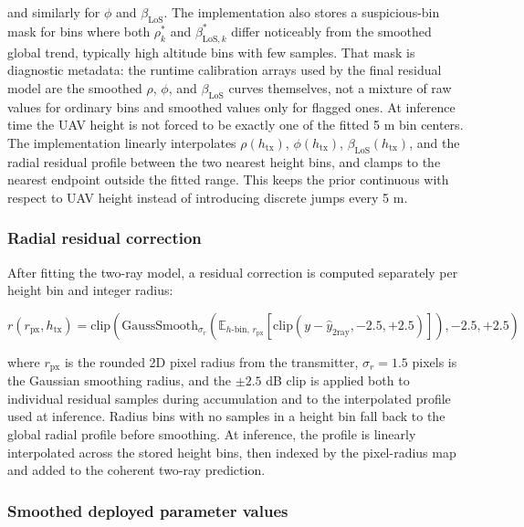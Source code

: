 and similarly for \(\phi\) and \(\beta_{\mathrm{LoS}}\). The implementation also stores a
suspicious-bin mask for bins where both \(\rho_k^*\) and
\(\beta_{\mathrm{LoS},k}^*\) differ
noticeably from the smoothed global trend, typically high altitude bins with
few samples. That mask is diagnostic metadata: the runtime calibration arrays
used by the final residual model are the smoothed \(\rho\), \(\phi\), and
\(\beta_{\mathrm{LoS}}\) curves themselves, not
a mixture of raw values for ordinary bins and smoothed values only for flagged
ones.
At inference time the UAV height is not forced to be exactly one of the fitted
5 m bin centers. The implementation linearly interpolates $\rho(h_{\mathrm{tx}})$,
\(\phi(h_{\mathrm{tx}})\), \(\beta_{\mathrm{LoS}}(h_{\mathrm{tx}})\), and the radial residual profile
between the two nearest height bins, and clamps to the nearest endpoint outside
the fitted range. This keeps the prior continuous with respect to UAV height
instead of introducing discrete jumps every 5 m.

\subsubsection{Radial residual correction}

After fitting the two-ray model, a residual correction is computed separately
per height bin and integer radius:

\begin{equation}
r(r_{\mathrm{px}},h_{\mathrm{tx}})
=
\mathrm{clip}\!\left(
\mathrm{GaussSmooth}_{\sigma_r}\left(
\mathbb{E}_{h\text{-bin},\,r_{\mathrm{px}}}
\left[
\mathrm{clip}\!\left(y-\hat y_{\mathrm{2ray}},-2.5,+2.5\right)
\right]
\right)
\!, -2.5,+2.5
\right)
\end{equation}

where $r_{\mathrm{px}}$ is the rounded 2D pixel radius from the transmitter,
$\sigma_r = 1.5$ pixels is the Gaussian smoothing radius, and the $\pm2.5$ dB
clip is applied both to individual residual samples during accumulation and
to the interpolated profile used at inference. Radius bins with no samples in
a height bin fall back to the global radial profile before smoothing. At
inference, the profile is linearly interpolated across the stored height bins,
then indexed by the pixel-radius map and added to the coherent two-ray
prediction.

\subsubsection{Smoothed deployed parameter values}

